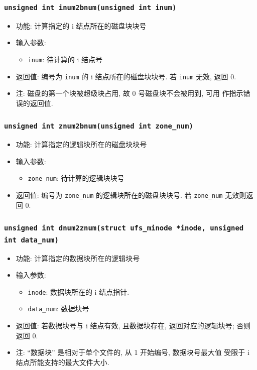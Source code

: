 \documentclass[nofonts]{ctexart}
\begin{document}
  \subsubsection[\texttt{inum2bnum}]{\texttt{unsigned int inum2bnum(unsigned int inum)}}
  \begin{itemize}
\item
  功能: 计算指定的 i 结点所在的磁盘块块号
\item
  输入参数:

  \begin{itemize}
  \item
    \texttt{inum}: 待计算的 i 结点号
  \end{itemize}
\item
  返回值: 编号为 \texttt{inum} 的 i 结点所在的磁盘块块号. 若
  \texttt{inum} 无效, 返回 0.
\item
  注: 磁盘的第一个块被超级块占用, 故 0 号磁盘块不会被用到, 可用
  作指示错误的返回值.
  \end{itemize}
  \subsubsection[\texttt{znum2bnum}]{\texttt{unsigned int znum2bnum(unsigned int zone\_num)}}
  \begin{itemize}
\item
  功能: 计算指定的逻辑块所在的磁盘块块号
\item
  输入参数:

  \begin{itemize}
  \item
    \texttt{zone\_num}: 待计算的逻辑块块号
  \end{itemize}
\item
  返回值: 编号为 \texttt{zone\_num} 的逻辑块所在的磁盘块块号. 若
  \texttt{zone\_num} 无效则返回 0.
  \end{itemize}
  \subsubsection[\texttt{dnum2znum}]{\texttt{unsigned int dnum2znum(struct ufs\_minode *inode, unsigned int data\_num)}}
\begin{itemize}
\item
  功能: 计算指定的数据块所在的逻辑块号
\item
  输入参数:

  \begin{itemize}
  \item
    \texttt{inode}: 数据块所在的 i 结点指针.
  \item
    \texttt{data\_num}: 数据块号
  \end{itemize}
\item
  返回值: 若数据块号与 i 结点有效, 且数据块存在, 返回对应的逻辑块号;
  否则返回 0.
\item
  注: ``数据块'' 是相对于单个文件的, 从 1 开始编号, 数据块号最大值
  受限于 i 结点所能支持的最大文件大小.
  \end{itemize}
\end{document}
